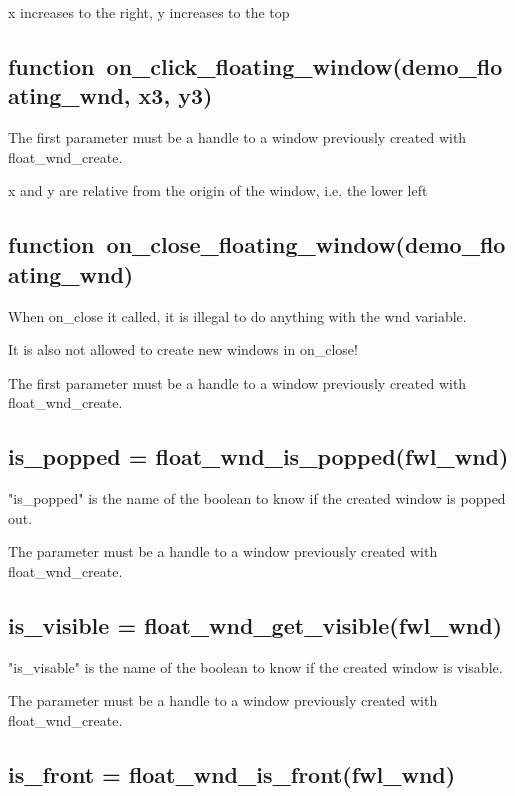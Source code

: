 \documentclass[11pt,parskip=half,a4paper]{scrartcl}
\begin{document}
x increases to the right, y increases to the top

\subsection{\hspace*{1.0mm}function\ on\_click\_floating\_window(demo\_floating\_wnd, x3, y3)}

The first parameter must be a handle to a window previously created with float\_wnd\_create.

x and y are relative from the origin of the window, i.e. the lower left

\subsection{\hspace*{1.0mm}function\ on\_close\_floating\_window(demo\_floating\_wnd)}

When on\_close it called, it is illegal to do anything with the wnd variable.

It is also not allowed to create new windows in on\_close!

The first parameter must be a handle to a window previously created with float\_wnd\_create.

\newpage
\subsection{\hspace*{1.0mm}is\_popped = float\_wnd\_is\_popped(fwl\_wnd)}

"is\_popped" is the name of the boolean to know if the created window is popped out.

The parameter must be a handle to a window previously created with float\_wnd\_create.

\subsection{\hspace*{1.0mm}is\_visible = float\_wnd\_get\_visible(fwl\_wnd)}

"is\_visable" is the name of the boolean to know if the created window is visable.

The parameter must be a handle to a window previously created with float\_wnd\_create.

\subsection{\hspace*{1.0mm}is\_front = float\_wnd\_is\_front(fwl\_wnd)}
\end{document}
